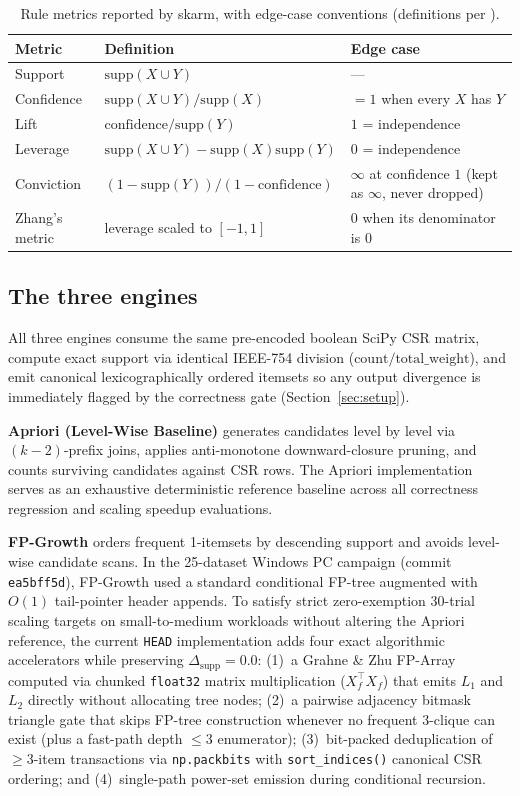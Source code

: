 \documentclass[journal,a4paper]{IEEEtran}
\newcommand{\skarm}{skarm\xspace}
\begin{document}
\begin{table}[t]
\centering
\caption{Rule metrics reported by \skarm, with edge-case conventions
(definitions per \cite{hahsler}).}
\label{tab:metrics}
\begin{tabular}{lll}
\toprule
Metric & Definition & Edge case \\
\midrule
Support & $\mathrm{supp}(X \cup Y)$ & --- \\
Confidence & $\mathrm{supp}(X \cup Y) / \mathrm{supp}(X)$ & $=1$ when every $X$ has $Y$ \\
Lift & $\mathrm{confidence} / \mathrm{supp}(Y)$ & $1$ = independence \\
Leverage & $\mathrm{supp}(X \cup Y) - \mathrm{supp}(X)\mathrm{supp}(Y)$ & $0$ = independence \\
Conviction & $(1 - \mathrm{supp}(Y)) / (1 - \mathrm{confidence})$ & $\infty$ at confidence $1$ (kept as $\infty$, never dropped) \\
Zhang's metric & leverage scaled to $[-1, 1]$ & $0$ when its denominator is $0$ \\
\bottomrule
\end{tabular}
\end{table}

\subsection{The three engines}
All three engines consume the same pre-encoded boolean SciPy CSR matrix,
compute exact support via identical IEEE-754 division
($\mathrm{count} / \mathrm{total\_weight}$), and emit canonical
lexicographically ordered itemsets so any output divergence is immediately
flagged by the correctness gate (Section~\ref{sec:setup}).

\textbf{Apriori (Level-Wise Baseline)} generates candidates level by level via
$(k-2)$-prefix joins, applies anti-monotone downward-closure pruning, and
counts surviving candidates against CSR rows. The Apriori implementation
serves as an exhaustive deterministic reference baseline across all
correctness regression and scaling speedup evaluations.

\textbf{FP-Growth} orders frequent 1-itemsets by descending support and
avoids level-wise candidate scans. In the 25-dataset Windows PC campaign
(commit \texttt{ea5bff5d}), FP-Growth used a standard conditional FP-tree
augmented with $O(1)$ tail-pointer header appends. To satisfy strict
zero-exemption 30-trial scaling targets on small-to-medium workloads
without altering the Apriori reference, the current \texttt{HEAD}
implementation adds four exact algorithmic accelerators while preserving
$\Delta_{\mathrm{supp}}=0.0$:
(1)~a Grahne \& Zhu FP-Array computed via chunked \texttt{float32} matrix
multiplication ($X_f^\top X_f$) that emits $L_1$ and $L_2$ directly without
allocating tree nodes; (2)~a pairwise adjacency bitmask triangle gate that
skips FP-tree construction whenever no frequent 3-clique can exist (plus a
fast-path depth $\le 3$ enumerator); (3)~bit-packed deduplication of
$\ge 3$-item transactions via \texttt{np.packbits} with \texttt{sort\_indices()}
canonical CSR ordering; and (4)~single-path power-set emission during
conditional recursion.
\end{document}
